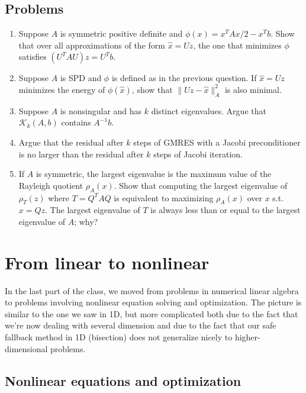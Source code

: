 \documentclass[12pt, leqno]{article}
\newcommand{\calK}{\mathcal{K}}
\begin{document}
\subsection{Problems}

\begin{enumerate}
\item
  Suppose $A$ is symmetric positive definite and
  $\phi(x) = x^T A x/2 - x^T b$.  Show that over all
  approximations of the form $\hat{x} = Uz$, the one
  that minimizes $\phi$ satisfies $(U^T A U) z = U^T b$.
\item
  Suppose $A$ is SPD and $\phi$ is defined as in the previous
  question.  If $\hat{x} = Uz$ minimizes the energy of
  $\phi(\hat{x})$, show that $\|Uz-\hat{x}\|_A^2$ is also minimal.
\item
  Suppose $A$ is nonsingular and has $k$ distinct eigenvalues.  Argue that
  $\calK_k(A,b)$ contains $A^{-1} b$.
\item
  Argue that the residual after $k$ steps of GMRES with a Jacobi
  preconditioner is no larger than the residual after $k$ steps of
  Jacobi iteration.
\item
  If $A$ is symmetric, the largest eigenvalue is the
  maximum value of the Rayleigh quotient $\rho_A(x)$.
  Show that computing the largest eigenvalue of $\rho_{T}(z)$
  where $T = Q^T A Q$ is equivalent to maximizing $\rho_A(x)$
  over $x$ s.t. $x = Qz$.  The largest eigenvalue of $T$
  is always less than or equal to the largest eigenvalue of $A$; why?
\end{enumerate}

\section{From linear to nonlinear}

In the last part of the class, we moved from problems in numerical
linear algebra to problems involving nonlinear equation solving
and optimization.  The picture is similar to the one we saw in 1D,
but more complicated both due to the fact that we're now dealing
with several dimension and due to the fact that our safe fallback
method in 1D (bisection) does not generalize nicely to
higher-dimensional problems.

\subsection{Nonlinear equations and optimization}
\end{document}
